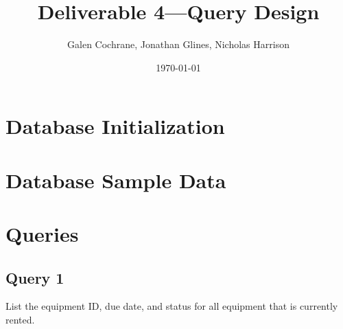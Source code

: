 \documentclass[12pt]{article}
\begin{document}
\lstset{breaklines=true,xleftmargin=-50pt}

\title{Deliverable 4---Query Design}
\date{\today}
\author{Galen Cochrane, Jonathan Glines, Nicholas Harrison }

\maketitle

\tableofcontents

\newpage

\section{Database Initialization}


\section{Database Sample Data}















\section{Queries}
\subsection*{Query 1}
List the equipment ID, due date, and status for all equipment that is currently
rented.

\end{document}
